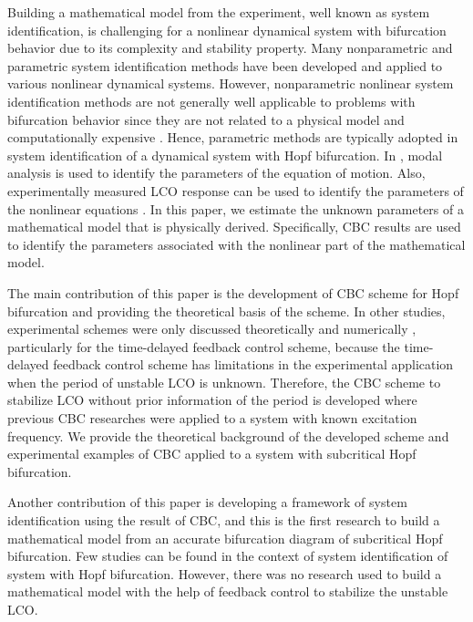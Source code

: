 \documentclass[openacc]{rsproca_new}%
\begin{document}
Building a mathematical model from the experiment, well known as system identification, is challenging for a nonlinear dynamical system with bifurcation behavior due to its complexity and stability property. Many nonparametric and parametric system identification methods have been developed and applied to various nonlinear dynamical systems. However, nonparametric nonlinear system identification methods are not generally well applicable to problems with bifurcation behavior since they are not related to a physical model and computationally expensive \cite{thothadri2005nonlinear}. Hence, parametric methods are typically adopted in system identification of a dynamical system with Hopf bifurcation. In \cite{fichera2014experimental}, modal analysis is used to identify the parameters of the equation of motion. Also, experimentally measured LCO response can be used to identify the parameters of the nonlinear equations \cite{abdelkefi2013analytical}. In this paper, we estimate the unknown parameters of a mathematical model that is physically derived. Specifically, CBC results are used to identify the parameters associated with the nonlinear part of the mathematical model.

The main contribution of this paper is the development of CBC scheme for Hopf bifurcation and providing the theoretical basis of the scheme. In other studies, experimental schemes were only discussed theoretically and numerically \cite{brown2011time,postlethwaite2013feedback}, particularly for the time-delayed feedback control scheme, because the time-delayed feedback control scheme has limitations in the experimental application when the period of unstable LCO is unknown. Therefore, the CBC scheme to stabilize LCO without prior information of the period is developed where previous CBC researches were applied to a system with known excitation frequency. We provide the theoretical background of the developed scheme and experimental examples of CBC applied to a system with subcritical Hopf bifurcation.

Another contribution of this paper is developing a framework of system identification using the result of CBC, and this is the first research to build a mathematical model from an accurate bifurcation diagram of subcritical Hopf bifurcation. Few studies \cite{abdelkefi2013analytical,thothadri2005nonlinear} can be found in the context of system identification of system with Hopf bifurcation. However, there was no research used to build a mathematical model with the help of feedback control to stabilize the unstable LCO.
\end{document}
